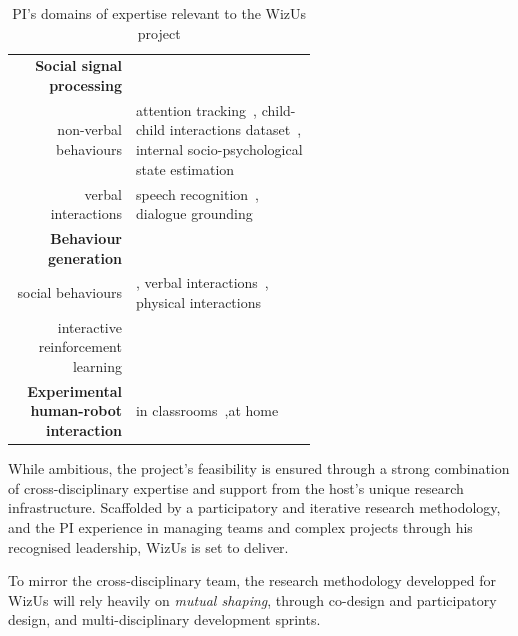 \documentclass[11pt]{report}
\newcommand{\project}{WizUs\xspace}
\begin{document}
\begin{table}[h]
\begin{tabular}{rp{0.6\linewidth}}
        \textbf{Social signal processing}\\
        non-verbal behaviours & \small attention
        tracking~\cite{lemaignan2016realtime}, child-child interactions
        dataset~\cite{lemaignan2018pinsoro}, \newline internal socio-psychological state estimation~\cite{bartlett2019what} \\
        verbal interactions & \small speech recognition~\cite{kennedy2017child}, dialogue grounding~\cite{lemaignan2011grounding} \\
        \midrule
        \textbf{Behaviour generation} \\
        social behaviours & \small \cite{lallee2011towards}, verbal interactions~\cite{wallbridge2019generating, wallbridge2019towards}, physical interactions~\cite{gharbi2013natural} \\
        \midrule
        interactive reinforcement learning & \small \cite{senft2017leveraging,senft2017supervised, senft2019teaching} \\
        \midrule
        \textbf{Experimental human-robot interaction} & \small in
        classrooms~\cite{hood2015when, lemaignan2016learning, jacq2016building,
        baxter2015wider,kennedy2016cautious,senft2018robots},\newline at home~\cite{mondada2015ranger}\\
        \bottomrule
    \end{tabular}
    \caption{\small PI's domains of expertise relevant to the \project project}
    \label{pi-expertise}
\end{table}




While ambitious, the project's feasibility is ensured through a strong
combination of cross-disciplinary expertise and support from the host's unique
research infrastructure. Scaffolded by a participatory and iterative research
methodology, and the PI experience in managing teams and complex projects
through his recognised leadership, \project is set to deliver.

To mirror the cross-disciplinary team, the research methodology developped for
\project will rely heavily on \emph{mutual shaping}, through co-design and
participatory design, and multi-disciplinary development sprints.
\end{document}
